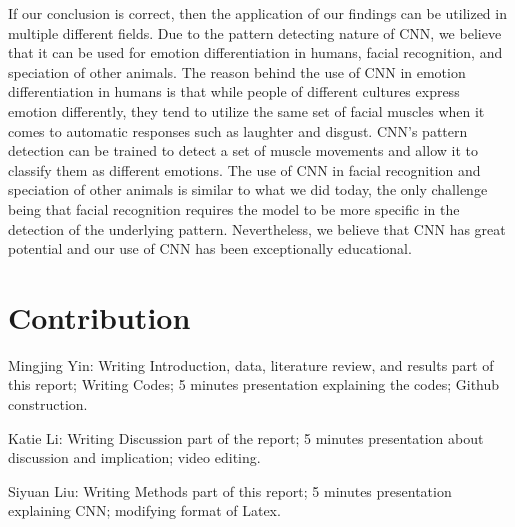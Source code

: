 \documentclass[12pt, letterpaper]{article}
\begin{document}
        If our conclusion is correct, then the application of our findings can be utilized in multiple different fields. Due to the pattern detecting nature of CNN, we believe that it can be used for emotion differentiation in humans, facial recognition, and speciation of other animals. The reason behind the use of CNN in emotion differentiation in humans is that while people of different cultures express emotion differently, they tend to utilize the same set of facial muscles when it comes to automatic responses such as laughter and disgust. CNN’s pattern detection can be trained to detect a set of muscle movements and allow it to classify them as different emotions. The use of CNN in facial recognition and speciation of other animals is similar to what we did today, the only challenge being that facial recognition requires the model to be more specific in the detection of the underlying pattern. Nevertheless, we believe that CNN has great potential and our use of CNN has been exceptionally educational.


       
 
\section{Contribution}

    
         Mingjing Yin: Writing Introduction, data, literature review, and results part of this report; Writing Codes; 5 minutes presentation explaining the codes; Github construction.
  
    Katie Li: Writing Discussion part of the report; 5 minutes presentation about discussion and implication; video editing.

    Siyuan Liu: Writing Methods part of this report; 5 minutes presentation explaining CNN; modifying format of Latex.
    
\end{document}
